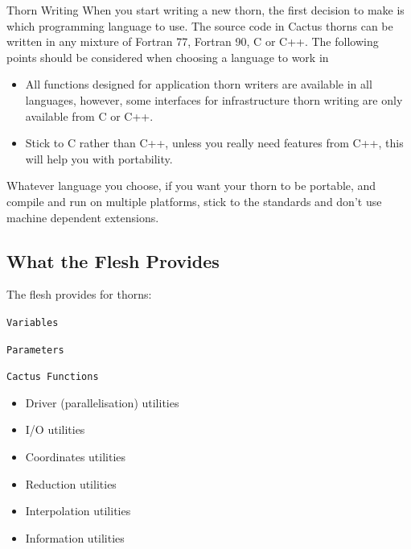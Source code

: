 \begin{cactuspart}{Thorn Writing}
When you start writing a new thorn, the first decision to make is
which programming language to use. The source code in Cactus thorns
can be written in any mixture of Fortran 77, Fortran 90,
C or C++. The following points should be considered when
choosing a language to work in
\begin{itemize}

\item All functions designed for application thorn writers are available
      in all languages, however, some interfaces for infrastructure
      thorn writing are only available from C or C++.


\item Stick to C rather than C++, unless you really need
      features from C++, this will help you with portability.

\end{itemize}

Whatever language you choose, if you want your thorn to be portable, and
compile and run on multiple platforms, stick to the standards and don't
use machine dependent extensions.


\subsection{What the Flesh Provides}

The flesh provides for thorns:
\begin{Lentry}
\item [\texttt{Variables}]
\item [\texttt{Parameters}]
\item [\texttt{Cactus Functions}]

\begin{itemize}
  \item{} Driver (parallelisation) utilities
  \item{} I/O utilities
  \item{} Coordinates utilities
  \item{} Reduction utilities
  \item{} Interpolation utilities
  \item{} Information utilities
\end{itemize}
\end{Lentry}



\end{cactuspart}

